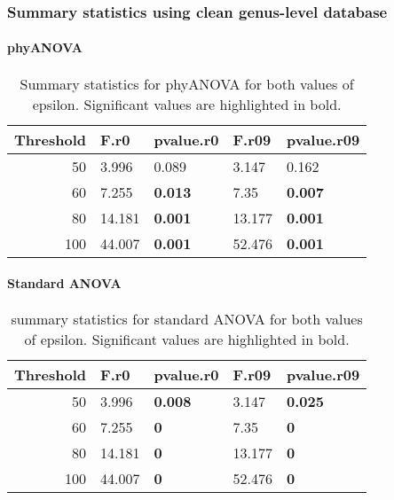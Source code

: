 \documentclass[]{article}
\let\oldparagraph\paragraph
\renewcommand{\paragraph}[1]{\oldparagraph{#1}\mbox{}}
\begin{document}
\hypertarget{summary-statistics-using-clean-genus-level-database}{%
\subsubsection{Summary statistics using clean genus-level
database}\label{summary-statistics-using-clean-genus-level-database}}

\hypertarget{phyanova-4}{%
\paragraph{phyANOVA}\label{phyanova-4}}

\begin{table}[H]

\caption{\label{tab:unnamed-chunk-24}Summary statistics for phyANOVA for both values of epsilon. Significant values are highlighted in bold.}
\centering
\begin{tabular}{r|l|l|l|l}
\hline
Threshold & F.r0 & pvalue.r0 & F.r09 & pvalue.r09\\
\hline
50 & 3.996 & 0.089 & 3.147 & 0.162\\
\hline
60 & 7.255 & \textbf{0.013} & 7.35 & \textbf{0.007}\\
\hline
80 & 14.181 & \textbf{0.001} & 13.177 & \textbf{0.001}\\
\hline
100 & 44.007 & \textbf{0.001} & 52.476 & \textbf{0.001}\\
\hline
\end{tabular}
\end{table}

\hypertarget{standard-anova-4}{%
\paragraph{Standard ANOVA}\label{standard-anova-4}}

\begin{table}[H]

\caption{\label{tab:unnamed-chunk-25}summary statistics for standard ANOVA for both values of epsilon. Significant values are highlighted in bold.}
\centering
\begin{tabular}{r|l|l|l|l}
\hline
Threshold & F.r0 & pvalue.r0 & F.r09 & pvalue.r09\\
\hline
50 & 3.996 & \textbf{0.008} & 3.147 & \textbf{0.025}\\
\hline
60 & 7.255 & \textbf{0} & 7.35 & \textbf{0}\\
\hline
80 & 14.181 & \textbf{0} & 13.177 & \textbf{0}\\
\hline
100 & 44.007 & \textbf{0} & 52.476 & \textbf{0}\\
\hline
\end{tabular}
\end{table}
\end{document}
